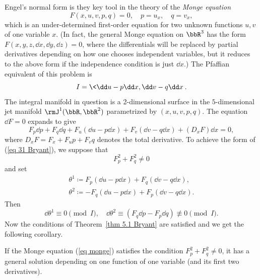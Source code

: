 Engel's normal form is they key tool in the theory of the \emph{Monge equation}
\[F(x,u,v,p,q)=0,\quad p=u_x,\quad q=v_x,\label{eq monge}\]
which is an under-determined first-order equation for two unknown functions $u,v$ of one variable $x$. (In fact, the general Monge equation on $\bbR^3$ has the form $F(x,y,z,\dd x,\dd y,\dd z)=0$, where the differentials will be replaced by partial derivatives depending on how one chooses independent variables, but it reduces to the above form if the independence condition is just $\dd x$.) The Pfaffian equivalent of this problem is 
\[I=\<\dd u-p \dd x,\dd v-q\dd x\>.\]
The integral manifold in question is a 2-dimensional surface in the $5$-dimensional jet manifold $\rmJ^1(\bbR,\bbR^2)$ parametrized by $(x,u,v,p,q)$. The equation $\dd F=0$ expands to give 
\[F_{p}\dd p+F_q \dd q+F_u(\dd u-p\dd x)+F_v(\dd v-q\dd x)+(D_x F)\dd x=0,\]
where $D_x F= F_x+F_u p+F_v q$ denotes the total derivative. To achieve the form of (\ref{eq 31 Bryant}), we suppose that 
\[F^2_p +F^2_q\neq 0\]
and set 
\begin{align}
    \theta^1\coloneqq F_p(\dd u-p\dd x)+F_q(\dd v-q \dd x),\\
    \theta^2\coloneqq -F_q(\dd u-p\dd x)+F_p(\dd v-q\dd x).
\end{align}
Then 
\[\dd \theta^1\equiv 0 \pmod{I},\quad \dd\theta^2\equiv (F_q \dd p-F_p \dd q)\not\equiv 0\pmod{I}.\]
Now the conditions of Theorem~\ref{thm 5.1 Bryant} are satisfied and we get the following corollary.

\begin{cor}
    If the Monge equation (\ref{eq monge}) satisfies the condition $F_p^2+F_q^2\neq 0$, it has a general solution depending on one function of one variable (and its first two derivatives).
\end{cor}

